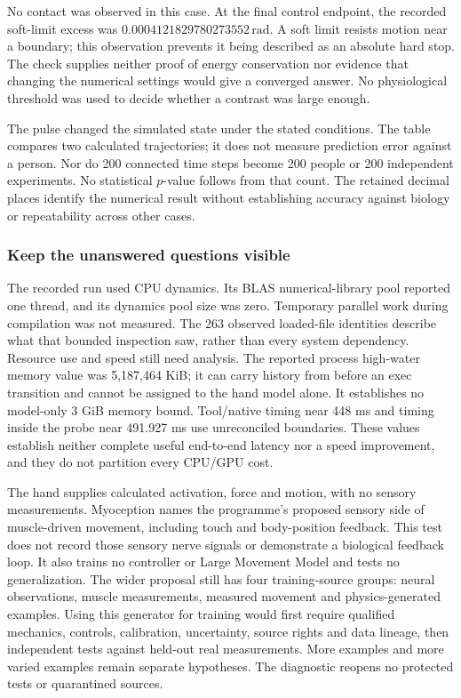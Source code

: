 No contact was observed in this case. At the final control endpoint, the recorded soft-limit excess was $0.0004121829780273552\,\mathrm{rad}$. A soft limit resists motion near a boundary; this observation prevents it being described as an absolute hard stop. The check supplies neither proof of energy conservation nor evidence that changing the numerical settings would give a converged answer. No physiological threshold was used to decide whether a contrast was large enough.

The pulse changed the simulated state under the stated conditions. The table compares two calculated trajectories; it does not measure prediction error against a person. Nor do 200 connected time steps become 200 people or 200 independent experiments. No statistical $p$-value follows from that count. The retained decimal places identify the numerical result without establishing accuracy against biology or repeatability across other cases.

\subsubsection{Keep the unanswered questions visible}

The recorded run used CPU dynamics. Its BLAS numerical-library pool reported one thread, and its dynamics pool size was zero. Temporary parallel work during compilation was not measured. The 263 observed loaded-file identities describe what that bounded inspection saw, rather than every system dependency. Resource use and speed still need analysis. The reported process high-water memory value was 5,187,464 KiB; it can carry history from before an exec transition and cannot be assigned to the hand model alone. It establishes no model-only 3 GiB memory bound. Tool/native timing near 448 ms and timing inside the probe near 491.927 ms use unreconciled boundaries. These values establish neither complete useful end-to-end latency nor a speed improvement, and they do not partition every CPU/GPU cost.

The hand supplies calculated activation, force and motion, with no sensory measurements. Myoception names the programme's proposed sensory side of muscle-driven movement, including touch and body-position feedback. This test does not record those sensory nerve signals or demonstrate a biological feedback loop. It also trains no controller or Large Movement Model and tests no generalization. The wider proposal still has four training-source groups: neural observations, muscle measurements, measured movement and physics-generated examples. Using this generator for training would first require qualified mechanics, controls, calibration, uncertainty, source rights and data lineage, then independent tests against held-out real measurements. More examples and more varied examples remain separate hypotheses. The diagnostic reopens no protected tests or quarantined sources.

